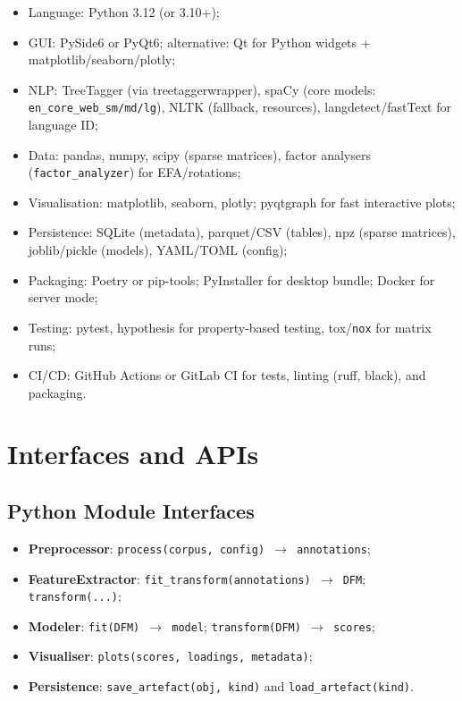 \begin{itemize}
    \item Language: Python 3.12 (or 3.10+);
    \item GUI: PySide6 or PyQt6; alternative: Qt for Python widgets + matplotlib/seaborn/plotly;
    \item NLP: TreeTagger (via treetaggerwrapper), spaCy (core models: \texttt{en\_core\_web\_sm/md/lg}), NLTK (fallback, resources), langdetect/fastText for language ID;
    \item Data: pandas, numpy, scipy (sparse matrices), factor analysers (\texttt{factor\_analyzer}) for EFA/rotations;
    \item Visualisation: matplotlib, seaborn, plotly; pyqtgraph for fast interactive plots;
    \item Persistence: SQLite (metadata), parquet/CSV (tables), npz (sparse matrices), joblib/pickle (models), YAML/TOML (config);
    \item Packaging: Poetry or pip-tools; PyInstaller for desktop bundle; Docker for server mode;
    \item Testing: pytest, hypothesis for property-based testing, tox/\texttt{nox} for matrix runs;
    \item CI/CD: GitHub Actions or GitLab CI for tests, linting (ruff, black), and packaging.
\end{itemize}

\section{Interfaces and APIs}

\subsection{Python Module Interfaces}

\begin{itemize}
    \item \textbf{Preprocessor}: \texttt{process(corpus, config) $\rightarrow$ annotations};
    \item \textbf{FeatureExtractor}: \texttt{fit\_transform(annotations) $\rightarrow$ DFM}; \texttt{transform(...)};
    \item \textbf{Modeler}: \texttt{fit(DFM) $\rightarrow$ model}; \texttt{transform(DFM) $\rightarrow$ scores};
    \item \textbf{Visualiser}: \texttt{plots(scores, loadings, metadata)};
    \item \textbf{Persistence}: \texttt{save\_artefact(obj, kind)} and \texttt{load\_artefact(kind)}.
\end{itemize}

